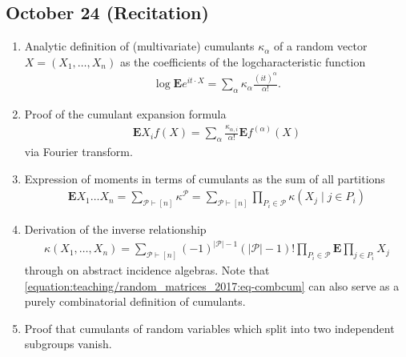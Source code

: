 \documentclass[letterpaper,10pt,english]{sphinxhowto}
\begin{document}
\subsection{October 24 (Recitation)}
\label{\detokenize{teaching/random_matrices_2017:october-24-recitation}}\begin{enumerate}
%
\item {} 
\sphinxAtStartPar
Analytic definition of (multivariate) cumulants \(\kappa_\alpha\) of a random vector \(X=(X_1,\dots,X_n)\) as the coefficients of the log\sphinxhyphen{}characteristic function
\begin{equation*}
\begin{split}
    \log \mathbf E e^{i t\cdot X} = \sum_\alpha \kappa_\alpha \frac{(it)^\alpha}{\alpha!}.
    \end{split}
\end{equation*}
\item {} 
\sphinxAtStartPar
Proof of the cumulant expansion formula
\begin{equation*}
\begin{split}
    \mathbf E X_i f(X)=\sum_{\alpha} \frac{\kappa_{\alpha, i }}{\alpha!}\mathbf E f^{(\alpha)}(X)
    \end{split}
\end{equation*}
\sphinxAtStartPar
via Fourier transform.

\item {} 
\sphinxAtStartPar
Expression of moments in terms of cumulants as the sum of all partitions
\begin{equation*}
\begin{split}
    \mathbf{E} X_1\dots X_n=\sum_{\mathcal{P}\vdash [n]} \kappa^{\mathcal{P}}=\sum_{\mathcal{P}\vdash [n]}\prod_{P_i\in\mathcal{P}} \kappa( X_j \mid j\in P_i )
    \end{split}
\end{equation*}
\item {} 
\sphinxAtStartPar
Derivation of the inverse relationship
\begin{equation}\label{equation:teaching/random_matrices_2017:eq-combcum}
\begin{split}
    \kappa(X_1,\dots,X_n)=\sum_{\mathcal P\vdash [n]}(-1)^{\lvert\mathcal P\rvert-1}(\lvert\mathcal P\rvert-1)! \prod_{P_i\in\mathcal P} \mathbf E \prod_{j\in P_i} X_j
    \end{split}
\end{equation}
\sphinxAtStartPar
through  on abstract incidence algebras. Note that \eqref{equation:teaching/random_matrices_2017:eq-combcum} can also serve as a purely combinatorial definition of cumulants.

\item {} 
\sphinxAtStartPar
Proof that cumulants of random variables which split into two independent subgroups vanish.

\end{enumerate}
\end{document}
